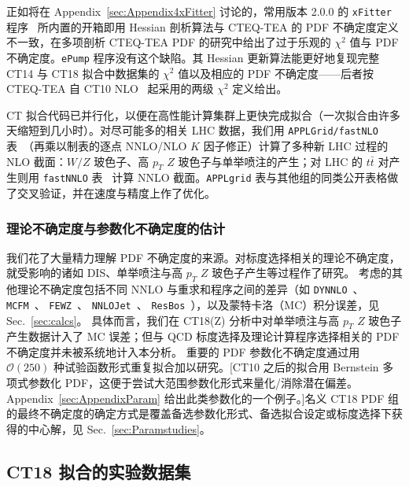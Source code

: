 正如将在 Appendix~\ref{sec:Appendix4xFitter} 讨论的，常用版本 2.0.0 的 \texttt{xFitter} 程序~\cite{Alekhin:2014irh} 所内置的开箱即用 Hessian 剖析算法与 CTEQ-TEA 的 PDF 不确定度定义不一致，在多项剖析 CTEQ-TEA PDF 的研究中给出了过于乐观的 $\chi^2$ 值与 PDF 不确定度。\texttt{ePump} 程序没有这个缺陷。其 Hessian 更新算法能更好地复现完整 CT14 与 CT18 拟合中数据集的 $\chi^2$ 值以及相应的 PDF 不确定度——后者按 CTEQ-TEA 自 CT10 NLO~\cite{Gao:2013xoa} 起采用的两级 $\chi^2$ 定义给出。

CT 拟合代码已并行化，以便在高性能计算集群上更快完成拟合（一次拟合由许多天缩短到几小时）。对尽可能多的相关 LHC 数据，我们用 \texttt{APPLGrid/fastNLO} 表~\cite{Kluge:2006xs,Carli:2010rw}（再乘以制表的逐点 NNLO/NLO $K$ 因子修正）计算了多种新 LHC 过程的 NLO 截面：$W/Z$ 玻色子、高 $p_{T}$ $Z$ 玻色子与单举喷注的产生；对 LHC 的 $t\bar{t}$ 对产生则用 \texttt{fastNNLO} 表~\cite{Czakon:2017dip,fastnnlo:grids} 计算 NNLO 截面。\texttt{APPLgrid} 表与其他组的同类公开表格做了交叉验证，并在速度与精度上作了优化。

\subsubsection{理论不确定度与参数化不确定度的估计}
我们花了大量精力理解 PDF 不确定度的来源。对标度选择相关的理论不确定度，就受影响的诸如 DIS、单举喷注与高 $p_{T}$ $Z$ 玻色子产生等过程作了研究。
考虑的其他理论不确定度包括不同 NNLO 与重求和程序之间的差异（如
\texttt{DYNNLO}~\cite{Catani:2007vq,Catani:2009sm}、
\texttt{MCFM}~\cite{Campbell:2010ff, Boughezal:2016wmq, MCFM8}、
\texttt{FEWZ}~\cite{Gavin:2010az, Gavin:2012sy, Li:2012wna}、
\texttt{NNLOJet}~\cite{Ridder:2015dxa,Gehrmann-DeRidder:2017mvr,Currie:2016bfm,Currie:2017ctp}、
\texttt{ResBos}~\cite{Ladinsky:1993zn, Balazs:1997xd}），以及蒙特卡洛（MC）积分误差，见 Sec.~\ref{sec:calcs}。
具体而言，我们在 CT18(Z) 分析中对单举喷注与高 $p_T$ $Z$ 玻色子产生数据计入了 MC 误差；但与 QCD 标度选择及理论计算程序选择相关的 PDF 不确定度并未被系统地计入本分析。
重要的 PDF 参数化不确定度通过用 $\mathcal{O}(250)$ 种试验函数形式重复拟合加以研究。[CT10 之后的拟合用 Bernstein 多项式参数化 PDF，这便于尝试大范围参数化形式来量化/消除潜在偏差。Appendix~\ref{sec:AppendixParam} 给出此类参数化的一个例子。]名义 CT18 PDF 组的最终不确定度的确定方式是覆盖备选参数化形式、备选拟合设定或标度选择下获得的中心解，见 Sec.~\ref{sec:Paramstudies}。

\subsection{CT18 拟合的实验数据集}
\label{sec:data_overview}

